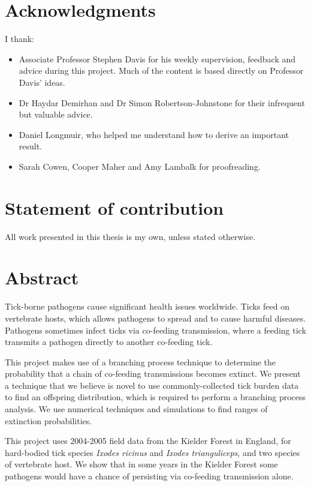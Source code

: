 \documentclass{article}
\begin{document}
\section*{Acknowledgments}
I thank:
\begin{itemize}
\item Associate Professor Stephen Davis for his weekly supervision, feedback and advice during this project. Much of the content is based directly on Professor Davis' ideas.
\item Dr Haydar Demirhan and Dr Simon Robertson-Johnstone for their infrequent but valuable advice.
\item Daniel Longmuir, who helped me understand how to derive an important result.
\item Sarah Cowen, Cooper Maher and Amy Lambalk for proofreading. 
\end{itemize}

\section*{Statement of contribution}

All work presented in this thesis is my own, unless stated otherwise.

\thispagestyle{empty}
\addtocounter{page}{-1}

\newpage

\section*{Abstract}

Tick-borne pathogens cause significant health issues worldwide. Ticks feed on vertebrate hosts, which allows pathogens to spread and to cause harmful diseases. Pathogens sometimes infect ticks via co-feeding transmission, where a feeding tick transmits a pathogen directly to another co-feeding tick.

This project makes use of a branching process technique to determine the probability that a chain of co-feeding transmissions becomes extinct. We present a technique that we believe is novel to use commonly-collected tick burden data to find an offspring distribution, which is required to perform a branching process analysis. We use numerical techniques and simulations to find ranges of extinction probabilities.

This project uses 2004-2005 field data from the Kielder Forest in England, for hard-bodied tick species \textit{Ixodes ricinus} and \textit{Ixodes trianguliceps}, and two species of vertebrate host. We show that in some years in the Kielder Forest some pathogens would have a chance of persisting via co-feeding transmission alone.
\end{document}
